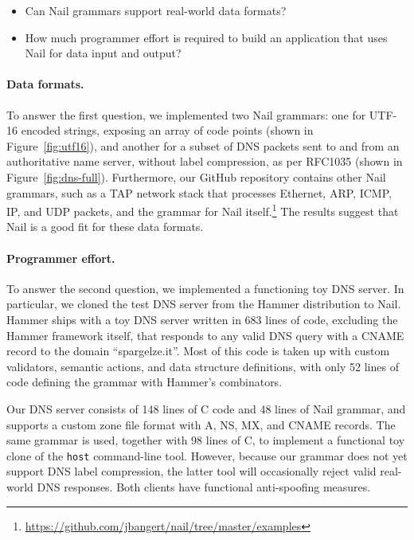 \begin{itemize}
\item Can Nail grammars support real-world data formats?
\item How much programmer effort is required to build an
      application that uses Nail for data input and output?
\end{itemize}

\paragraph{Data formats.}

To answer the first question, we implemented two Nail grammars:
one for UTF-16 encoded strings, exposing an array of code points
(shown in Figure~\ref{fig:utf16}), and another for a subset of DNS
packets sent to and from an authoritative name server, without label
compression, as per RFC1035 (shown in Figure~\ref{fig:dns-full}).
Furthermore, our GitHub repository contains other Nail
grammars, such as a TAP network stack that processes Ethernet,
ARP, ICMP, IP, and UDP packets, and the grammar for Nail
itself.\footnote{\url{https://github.com/jbangert/nail/tree/master/examples}}
The results suggest that Nail is a good fit for these data formats.


\paragraph{Programmer effort.}

To answer the second question, we implemented a functioning toy DNS
server.  In particular, we cloned the test DNS server from the Hammer
distribution to Nail.  Hammer ships with a toy DNS server written in 683
lines of code, excluding the Hammer framework itself, that responds to
any valid DNS query with a CNAME record to the domain ``spargelze.it''.
Most of this code is taken up with custom validators, semantic actions,
and data structure definitions, with only 52 lines of code defining the
grammar with Hammer's combinators.

Our DNS server consists of 148 lines of C code and 48 lines of Nail
grammar, and supports a custom zone file format with A, NS, MX, and
CNAME records. The same grammar is used, together with 98 lines of C,
to implement a functional toy clone of the \texttt{host} command-line
tool. However, because our grammar does not yet support DNS label
compression, the latter tool will occasionally reject valid real-world
DNS responses. Both clients have functional anti-spoofing measures.

